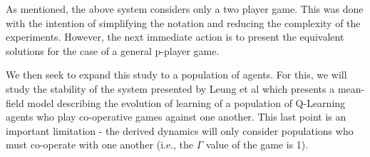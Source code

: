 \documentclass[.../main.tex]{subfiles}
\begin{document}
    As mentioned, the above system considers only a two player game. This was done with the intention
    of simplifying the notation and reducing the complexity of the experiments. However, the next
    immediate action is to present the equivalent solutions for the case of a general p-player game.
    
    We then seek to expand this study to a population of agents. For
    this, we will study the stability of the system presented by Leung
    et al \cite{Hu2019} which presents a mean-field model describing
    the evolution of learning of a population of Q-Learning agents who
    play co-operative games against one another. This last point is an
    important limitation - the derived dynamics will only consider
    populations who must co-operate with one another (i.e., the
    $\Gamma$ value of the game is 1).
\end{document}
